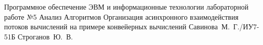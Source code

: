 \documentclass{bmstu}
\begin{document}
	
	{Программное обеспечение ЭВМ и информационные технологии}
	{лабораторной работе №5}
	{Анализ Алгоритмов}
	{Организация асинхронного взаимодействия потоков вычислений на примере конвейерных вычислений}
	{}
	{Савинова~М.~Г./ИУ7-51Б}
	{Строганов~Ю.~В.}
	
	\maketableofcontents
	
	
	
	
	
	
	
	
	\makebibliography
	
\end{document}
